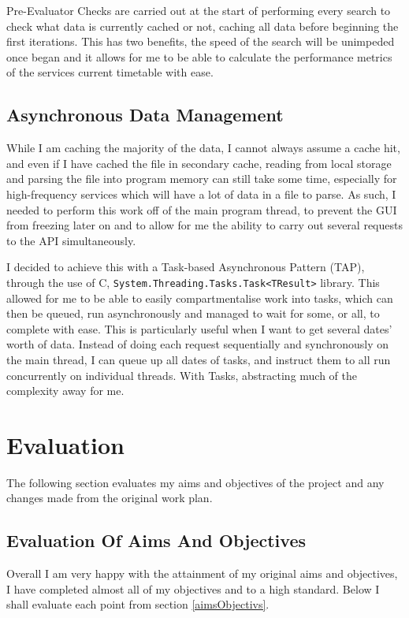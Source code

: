 \documentclass{article}
\newcommand{\CS}{C\nolinebreak\hspace{-.05em}\raisebox{.6ex}{\tiny\bf \#}}
\begin{document}
\par
Pre-Evaluator Checks are carried out at the start of performing every search to check what data is currently cached or not, caching all data before beginning the first iterations. This has two benefits, the speed of the search will be unimpeded once began and it allows for me to be able to calculate the performance metrics of the services current timetable with ease.  


\subsection{Asynchronous Data Management}
While I am caching the majority of the data, I cannot always assume a cache hit, and even if I have cached the file in secondary cache, reading from local storage and parsing the file into program memory can still take some time, especially for high-frequency services which will have a lot of data in a file to parse. As such, I needed to perform this work off of the main program thread, to prevent the GUI from freezing later on and to allow for me the ability to carry out several requests to the API simultaneously.  


\par 
I decided to achieve this with a Task-based Asynchronous Pattern (TAP)\cite{RN29}, through the use of \CS, \texttt{System.Threading.Tasks.Task\textless TResult\textgreater}  library. This allowed for me to be able to easily compartmentalise work into tasks, which can then be queued, run asynchronously and managed to wait for some, or all, to complete with ease. This is particularly useful when I want to get several dates' worth of data. Instead of doing each request sequentially and synchronously on the main thread, I can queue up all dates of tasks, and instruct them to all run concurrently on individual threads. With Tasks, abstracting much of the complexity away for me.  



\section{Evaluation}
The following section evaluates my aims and objectives of the project and any changes made from the original work plan. 

\subsection{Evaluation Of Aims And Objectives}
Overall I am very happy with the attainment of my original aims and objectives, I have completed almost all of my objectives and to a high standard. Below I shall evaluate each point from section \ref{aimsObjectivs}.
\end{document}
